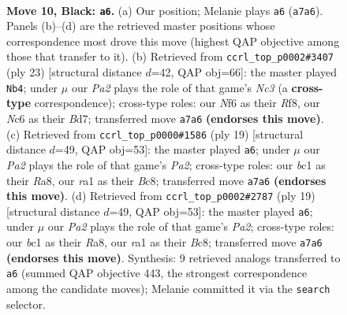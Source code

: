 \documentclass[11pt]{article}
\begin{document}
\begin{figure}[p]
\label{fig:thought-m17}
\end{figure}

\clearpage

\begin{figure}[p]\centering
\begin{subfigure}{0.46\textwidth}\centering
\resizebox{\linewidth}{!}{%
\newchessgame
\chessboard[
  setfen={r2q1rk1/pp1bbppp/2n1pn2/2Pp4/3P4/P1N2N2/1P2BPPP/R1BQ1RK1 b - - 0 10},
  showmover=false,
  pgfstyle=straightmove, color=movearrow, markmove={a7-a6}
]}
\caption{}
\end{subfigure}\hfill
\begin{subfigure}{0.46\textwidth}\centering
\resizebox{\linewidth}{!}{%
\newchessgame
\chessboard[
  setfen={r2q1rk1/1p1bbppp/p1np1n2/4pP2/4P3/2NBBN2/PPP1Q1PP/2KR3R b - - 0 12},
  showmover=false,
  pgfstyle=straightmove, color=movearrow, markmove={c6-b4}
]}
\caption{}
\end{subfigure}
\\[4pt]
\begin{subfigure}{0.46\textwidth}\centering
\resizebox{\linewidth}{!}{%
\newchessgame
\chessboard[
  setfen={r1bq1rk1/pp2bppp/2n2n2/3p4/2pP1B2/2N1P3/PPB1NPPP/R2Q1RK1 b - - 1 10},
  showmover=false,
  pgfstyle=straightmove, color=movearrow, markmove={a7-a6}
]}
\caption{}
\end{subfigure}\hfill
\begin{subfigure}{0.46\textwidth}\centering
\resizebox{\linewidth}{!}{%
\newchessgame
\chessboard[
  setfen={r1bq1rk1/pp2bppp/2n2n2/3p4/2pP1B2/2N1P3/PPB1NPPP/R2Q1RK1 b - - 1 10},
  showmover=false,
  pgfstyle=straightmove, color=movearrow, markmove={a7-a6}
]}
\caption{}
\end{subfigure}
\caption{\textbf{Move 10, Black: \texttt{a6}.} (a) Our position; Melanie plays \texttt{a6} (\texttt{a7a6}). Panels (b)--(d) are the retrieved master positions whose correspondence most drove this move (highest QAP objective among those that transfer to it). (b) Retrieved from \texttt{ccrl\_top\_p0002\#3407} (ply 23) [structural distance $d$=42, QAP obj=66]: the master played \texttt{Nb4}; under $\mu$ our \emph{Pa2} plays the role of that game's \emph{Nc3} (a \textbf{cross-type} correspondence); cross-type roles: our \emph{N}f6 as their \emph{R}f8, our \emph{N}c6 as their \emph{B}d7; transferred move \texttt{a7a6} \textbf{(endorses this move)}. (c) Retrieved from \texttt{ccrl\_top\_p0000\#1586} (ply 19) [structural distance $d$=49, QAP obj=53]: the master played \texttt{a6}; under $\mu$ our \emph{Pa2} plays the role of that game's \emph{Pa2}; cross-type roles: our \emph{b}c1 as their \emph{R}a8, our \emph{r}a1 as their \emph{B}c8; transferred move \texttt{a7a6} \textbf{(endorses this move)}. (d) Retrieved from \texttt{ccrl\_top\_p0002\#2787} (ply 19) [structural distance $d$=49, QAP obj=53]: the master played \texttt{a6}; under $\mu$ our \emph{Pa2} plays the role of that game's \emph{Pa2}; cross-type roles: our \emph{b}c1 as their \emph{R}a8, our \emph{r}a1 as their \emph{B}c8; transferred move \texttt{a7a6} \textbf{(endorses this move)}. Synthesis: 9 retrieved analogs transferred to \texttt{a6} (summed QAP objective 443, the strongest correspondence among the candidate moves); Melanie committed it via the \texttt{search} selector.}

\end{figure}
\end{document}
